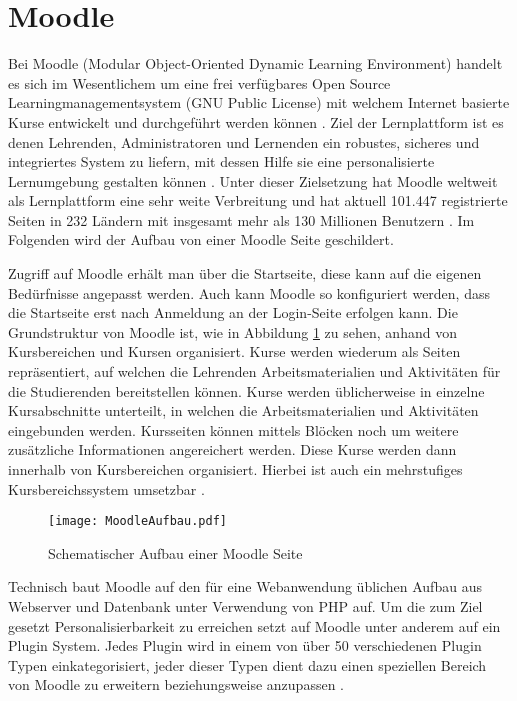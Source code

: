 \section{Moodle}
\label{sec:moodle}
Bei Moodle (Modular Object-Oriented Dynamic Learning Environment) handelt es sich im Wesentlichem um eine frei verfügbares Open Source Learningmanagementsystem (GNU Public License) mit welchem Internet basierte Kurse entwickelt und durchgeführt werden können \citep{moodle2015was}. Ziel der Lernplattform ist es denen Lehrenden, Administratoren und Lernenden ein robustes, sicheres und integriertes System zu liefern, mit dessen Hilfe sie eine personalisierte Lernumgebung gestalten können \citep{moodle2018about}. Unter dieser Zielsetzung hat  Moodle weltweit als Lernplattform eine sehr weite Verbreitung und hat aktuell 101.447 registrierte Seiten in 232 Ländern mit insgesamt mehr als 130 Millionen Benutzern \citep{moodle2018stats}. Im Folgenden wird der Aufbau von einer Moodle Seite geschildert.

Zugriff auf Moodle erhält man über die Startseite, diese kann auf die eigenen Bedürfnisse angepasst werden. Auch kann Moodle so konfiguriert werden, dass die Startseite erst nach Anmeldung an der Login-Seite erfolgen kann. Die Grundstruktur von Moodle ist, wie in Abbildung \ref{fig:MoodleAufbau} zu sehen, anhand von Kursbereichen und Kursen organisiert. Kurse werden wiederum als Seiten repräsentiert, auf welchen die Lehrenden Arbeitsmaterialien und Aktivitäten für die Studierenden bereitstellen können. Kurse werden üblicherweise in einzelne Kursabschnitte unterteilt, in welchen die Arbeitsmaterialien und Aktivitäten eingebunden werden. Kursseiten können mittels Blöcken noch um weitere zusätzliche Informationen angereichert werden. Diese Kurse werden dann innerhalb von Kursbereichen organisiert. Hierbei ist auch ein mehrstufiges Kursbereichssystem umsetzbar \citep{moodle2015aufbau}.

\begin{figure}[h!]
\texttt{[image: MoodleAufbau.pdf]}
\caption{\label{fig:MoodleAufbau}Schematischer Aufbau einer Moodle Seite}
\end{figure}

Technisch baut Moodle auf den für eine Webanwendung üblichen Aufbau aus Webserver und Datenbank unter Verwendung von PHP auf. Um die zum Ziel gesetzt Personalisierbarkeit zu erreichen setzt auf Moodle unter anderem auf ein Plugin System. Jedes Plugin wird in einem von über 50 verschiedenen Plugin Typen einkategorisiert, jeder dieser Typen dient dazu einen speziellen Bereich von Moodle zu erweitern beziehungsweise anzupassen \citep{moodle2017plugin}.


